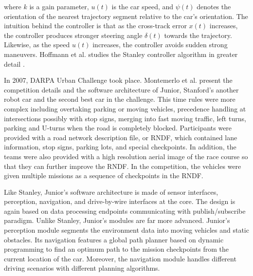 where $k$ is a gain parameter, $u(t)$ is the car speed, and $\psi(t)$ denotes
the orientation of the nearest trajectory segment relative to the car's
orientation. The intuition behind the controller is that as the cross-track
error $x(t)$ increases, the controller produces stronger steering angle
$\delta(t)$ towards the trajectory. Likewise, as the speed $u(t)$ increases,
the controller avoids sudden strong maneuvers. Hoffmann et al. studies the
Stanley controller algorithm in greater detail \cite{Hoffmann2007AutonomousAT}.

In 2007, DARPA Urban Challenge took place. Montemerlo et al.
\cite{Montemerlo2009JuniorTS} present the competition details and the software
architecture of Junior, Stanford's another robot car and the second best car in
the challenge. This time rules were more complex including overtaking parking
or moving vehicles, precedence handling at intersections possibly with stop
signs, merging into fast moving traffic, left turns, parking and U-turns when
the road is completely blocked. Participants were provided with a road network
description file, or RNDF, which contained lane information, stop signs,
parking lots, and special checkpoints. In addition, the teams were also
provided with a high resolution aerial image of the race course so that they
can further improve the RNDF. In the competition, the vehicles were given
multiple missions as a sequence of checkpoints in the RNDF.

Like Stanley, Junior's software architecture is made of sensor interfaces,
perception, navigation, and drive-by-wire interfaces at the core. The design
is again based on data processing endpoints communicating with
publish/subscribe paradigm. Unlike Stanley, Junior's modules are far more
advanced. Junior's perception module segments the environment data into moving
vehicles and static obstacles. Its navigation features a global path planner
based on dynamic programming to find an optimum path to the mission checkpoints
from the current location of the car. Moreover, the navigation module handles
different driving scenarios with different planning algorithms.

